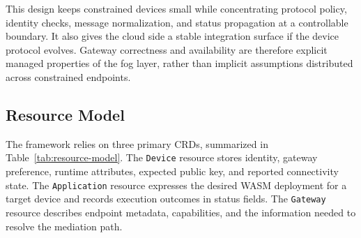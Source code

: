 This design keeps constrained devices small while concentrating protocol policy, identity checks, message normalization, and status propagation at a controllable boundary. It also gives the cloud side a stable integration surface if the device protocol evolves. Gateway correctness and availability are therefore explicit managed properties of the fog layer, rather than implicit assumptions distributed across constrained endpoints.

\subsection{Resource Model}
The framework relies on three primary CRDs, summarized in Table~\ref{tab:resource-model}. The \texttt{Device} resource stores identity, gateway preference, runtime attributes, expected public key, and reported connectivity state. The \texttt{Application} resource expresses the desired WASM deployment for a target device and records execution outcomes in status fields. The \texttt{Gateway} resource describes endpoint metadata, capabilities, and the information needed to resolve the mediation path.

\begin{table}
\centering
\caption{Primary CRDs and control/evidence ownership.}%
\label{tab:resource-model}
\footnotesize
\setlength{\tabcolsep}{3pt}
\end{table}

